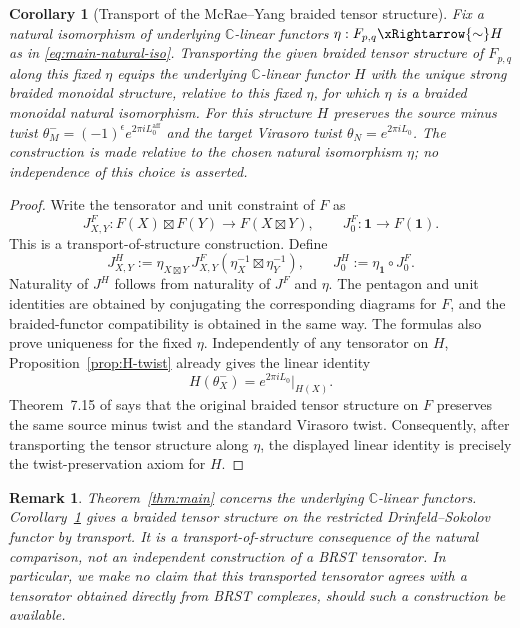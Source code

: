 \documentclass[12pt,leqno]{amsart}
\numberwithin{equation}{section}
\newtheorem{cor}[thm]{Corollary}
\newtheorem{rmk}[thm]{Remark}
\def\C{\mathbb{C}}
\begin{document}
\begin{cor}[Transport of the McRae--Yang braided tensor structure]\label{cor:transported-tensor}
Fix a natural isomorphism of underlying $\C$-linear functors
$\eta:F_{p,q}\xRightarrow{\sim}H$ as in
\eqref{eq:main-natural-iso}.  Transporting the given braided tensor
structure of $F_{p,q}$ along this fixed $\eta$ equips the underlying
$\C$-linear functor $H$ with the unique strong braided monoidal structure,
relative to this fixed $\eta$, for which $\eta$ is a braided monoidal
natural isomorphism.  For this structure $H$ preserves the source minus twist
$\theta^-_M=(-1)^\epsilon e^{2\pi iL^{\mathrm{aff}}_0}$ and the target
Virasoro twist $\theta_N=e^{2\pi iL_0}$.  The construction is made relative
to the chosen natural isomorphism $\eta$;
no independence of this choice is asserted.
\end{cor}

\begin{proof}
Write the tensorator and unit constraint of $F$ as
\[
 J^F_{X,Y}:F(X)\boxtimes F(Y)\longrightarrow F(X\boxtimes Y),
 \qquad
 J^F_0:\mathbf1\longrightarrow F(\mathbf1).
\]
This is a transport-of-structure construction.  Define
\[
 J^H_{X,Y}
 :=\eta_{X\boxtimes Y}\,J^F_{X,Y}
   (\eta_X^{-1}\boxtimes\eta_Y^{-1}),
 \qquad
 J^H_0:=\eta_{\mathbf1}\circ J^F_0.
\]
Naturality of $J^H$ follows from naturality of $J^F$ and $\eta$.
The pentagon and unit identities are obtained by conjugating the
corresponding diagrams for $F$, and the braided-functor compatibility is
obtained in the same way.  The formulas also prove uniqueness for the fixed $\eta$.  Independently of
any tensorator on $H$, Proposition~\ref{prop:H-twist} already gives the
linear identity
\[
 H(\theta^-_X)=e^{2\pi iL_0}|_{H(X)}.
\]
Theorem~7.15 of \cite{McRaeYang} says that the original braided tensor
structure on $F$ preserves the same source minus twist and the standard
Virasoro twist.  Consequently, after transporting the tensor structure
along $\eta$, the displayed linear identity is precisely the
twist-preservation axiom for $H$.
\end{proof}

\begin{rmk}\label{rmk:linear-vs-monoidal}
Theorem~\ref{thm:main} concerns the underlying $\C$-linear functors.
Corollary~\ref{cor:transported-tensor} gives a braided tensor structure on
the restricted Drinfeld--Sokolov functor by transport.  It is a
transport-of-structure consequence of the natural comparison, not an independent construction of a BRST tensorator.  In particular,
we make no claim that this transported tensorator agrees with a tensorator
obtained directly from BRST complexes, should such a construction be
available.
\end{rmk}
\end{document}
